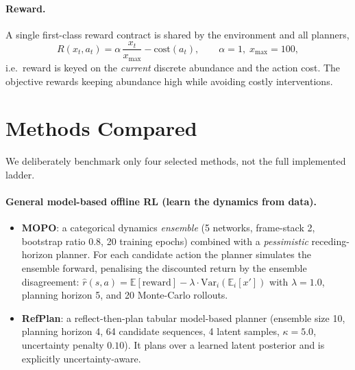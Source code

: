 \documentclass[11pt]{article}
\begin{document}
\paragraph{Reward.}
A single first-class reward contract is shared by the environment and all
planners,
\begin{equation}
  R(x_t, a_t) = \alpha \, \frac{x_t}{x_{\max}} - \mathrm{cost}(a_t),
  \qquad \alpha = 1, \; x_{\max} = 100,
\label{eq:reward}
\end{equation}
i.e.\ reward is keyed on the \emph{current} discrete abundance and the action
cost. The objective rewards keeping abundance high while avoiding costly
interventions.

\section{Methods Compared}

We deliberately benchmark only four selected methods, not the full implemented
ladder.

\paragraph{General model-based offline RL (learn the dynamics from data).}
\begin{itemize}
  \item \textbf{MOPO}: a categorical dynamics \emph{ensemble} (5 networks,
  frame-stack 2, bootstrap ratio 0.8, 20 training epochs) combined with a
  \emph{pessimistic} receding-horizon planner. For each candidate action the
  planner simulates the ensemble forward, penalising the discounted return by the
  ensemble disagreement: $\hat r(s,a) = \mathbb{E}[\text{reward}] - \lambda
  \cdot \mathrm{Var}_i(\mathbb{E}_i[x'])$ with $\lambda = 1.0$, planning horizon
  5, and 20 Monte-Carlo rollouts.
  \item \textbf{RefPlan}: a reflect-then-plan tabular model-based planner
  (ensemble size 10, planning horizon 4, 64 candidate sequences, 4 latent
  samples, $\kappa = 5.0$, uncertainty penalty $0.10$). It plans over a learned
  latent posterior and is explicitly uncertainty-aware.
\end{itemize}
\end{document}
